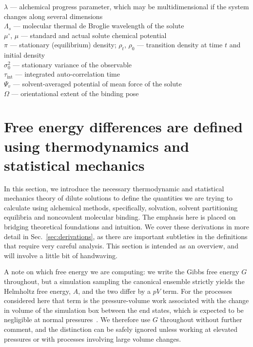 \documentclass[9pt,bestpractices]{livecoms}
\begin{document}
\begin{tcolorbox}[title=List of Symbols, colback=green!10!white, breakable]
$\lambda$ --- alchemical progress parameter, which may be multidimensional if the system changes along several dimensions \\
$\Lambda_s$ --- molecular thermal de Broglie wavelength of the solute \\
$\mu^\circ$, $\mu$ --- standard and actual solute chemical potential \\
$\pi$ --- stationary (equilibrium) density; $\rho_t$, $\rho_0$ --- transition density at time $t$ and initial density \\
$\sigma_0^2$ --- stationary variance of the observable\\
$\tau_{\mathrm{int}}$ --- integrated auto-correlation time\\
$\Psi_v$ --- solvent-averaged potential of mean force of the solute \\
$\Omega$ --- orientational extent of the binding pose
\end{tcolorbox}


\section{Free energy differences are defined using thermodynamics and statistical mechanics}
\label{sec:theory}

In this section, we introduce the necessary thermodynamic and statistical mechanics theory of dilute solutions to define the quantities we are trying to calculate using alchemical methods, specifically, solvation, solvent partitioning equilibria and noncovalent molecular binding. The emphasis here is placed on bridging theoretical foundations and intuition. We cover these derivations in more detail in Sec.~\ref{sec:derivations}, as there are important subtleties in the definitions that require very careful analysis. This section is intended as an overview, and will involve a little bit of handwaving.

A note on which free energy we are computing: we write the Gibbs free energy $G$ throughout, but a simulation sampling the canonical ensemble strictly yields the Helmholtz free energy, $A$, and the two differ by a $pV$ term. For the processes considered here that term is the pressure-volume work associated with the change in volume of the simulation box between the end states, which is expected to be negligible at normal pressures~\cite{gilson1997statisticalthermodynamic}. We therefore use $G$ throughout without further comment, and the distinction can be safely ignored unless working at elevated pressures or with processes involving large volume changes.
\end{document}
